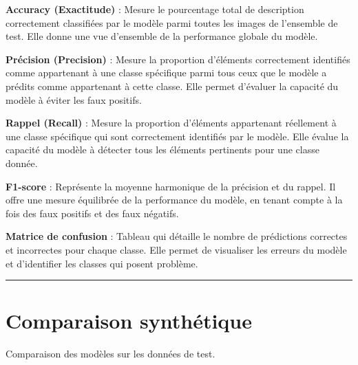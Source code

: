 \documentclass[
  french,
  letterpaper,
  DIV=11,
  numbers=noendperiod]{scrartcl}
\begin{document}
\begin{tcolorbox}[enhanced jigsaw, leftrule=.75mm, opacitybacktitle=0.6, titlerule=0mm, arc=.35mm, toprule=.15mm, breakable, toptitle=1mm, coltitle=black, colframe=quarto-callout-note-color-frame, bottomrule=.15mm, colback=white, colbacktitle=quarto-callout-note-color!10!white, opacityback=0, bottomtitle=1mm, title=\textcolor{quarto-callout-note-color}{\faInfo}\hspace{0.5em}{\emph{Pour rappel}}, left=2mm, rightrule=.15mm]

\textbf{Accuracy (Exactitude)} : Mesure le pourcentage total de
description correctement classifiées par le modèle parmi toutes les
images de l'ensemble de test. Elle donne une vue d'ensemble de la
performance globale du modèle.

\textbf{Précision (Precision)} : Mesure la proportion d'éléments
correctement identifiés comme appartenant à une classe spécifique parmi
tous ceux que le modèle a prédits comme appartenant à cette classe. Elle
permet d'évaluer la capacité du modèle à éviter les faux positifs.

\textbf{Rappel (Recall)} : Mesure la proportion d'éléments appartenant
réellement à une classe spécifique qui sont correctement identifiés par
le modèle. Elle évalue la capacité du modèle à détecter tous les
éléments pertinents pour une classe donnée.

\textbf{F1-score} : Représente la moyenne harmonique de la précision et
du rappel. Il offre une mesure équilibrée de la performance du modèle,
en tenant compte à la fois des faux positifs et des faux négatifs.

\textbf{Matrice de confusion} : Tableau qui détaille le nombre de
prédictions correctes et incorrectes pour chaque classe. Elle permet de
visualiser les erreurs du modèle et d'identifier les classes qui posent
problème.

\end{tcolorbox}

\begin{center}\rule{0.5\linewidth}{0.5pt}\end{center}

\section{Comparaison synthétique}\label{comparaison-synthuxe9tique}

Comparaison des modèles sur les données de test.
\end{document}

